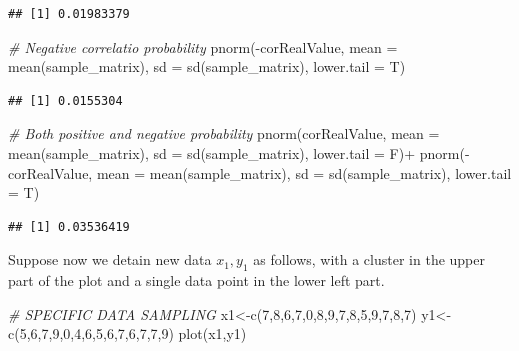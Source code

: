 \documentclass[
  notitlepage,
  onecolumn,
  openany]{book}
\newenvironment{Shaded}{\begin{snugshade}}{\end{snugshade}}
\newcommand{\AttributeTok}[1]{\textcolor[rgb]{0.77,0.63,0.00}{#1}}
\newcommand{\CommentTok}[1]{\textcolor[rgb]{0.56,0.35,0.01}{\textit{#1}}}
\newcommand{\DecValTok}[1]{\textcolor[rgb]{0.00,0.00,0.81}{#1}}
\newcommand{\FunctionTok}[1]{\textcolor[rgb]{0.00,0.00,0.00}{#1}}
\newcommand{\NormalTok}[1]{#1}
\newcommand{\OtherTok}[1]{\textcolor[rgb]{0.56,0.35,0.01}{#1}}
\newcommand{\SpecialCharTok}[1]{\textcolor[rgb]{0.00,0.00,0.00}{#1}}
\begin{document}
\begin{verbatim}
## [1] 0.01983379
\end{verbatim}

\begin{Shaded}
\begin{Highlighting}[]
\CommentTok{\# Negative correlatio probability}
\FunctionTok{pnorm}\NormalTok{(}\SpecialCharTok{{-}}\NormalTok{corRealValue, }\AttributeTok{mean =} \FunctionTok{mean}\NormalTok{(sample\_matrix), }
      \AttributeTok{sd =} \FunctionTok{sd}\NormalTok{(sample\_matrix), }\AttributeTok{lower.tail =}\NormalTok{ T)}
\end{Highlighting}
\end{Shaded}

\begin{verbatim}
## [1] 0.0155304
\end{verbatim}

\begin{Shaded}
\begin{Highlighting}[]
\CommentTok{\# Both positive and negative probability}
\FunctionTok{pnorm}\NormalTok{(corRealValue, }\AttributeTok{mean =} \FunctionTok{mean}\NormalTok{(sample\_matrix), }
      \AttributeTok{sd =} \FunctionTok{sd}\NormalTok{(sample\_matrix), }\AttributeTok{lower.tail =}\NormalTok{ F)}\SpecialCharTok{+}
  \FunctionTok{pnorm}\NormalTok{(}\SpecialCharTok{{-}}\NormalTok{corRealValue, }\AttributeTok{mean =} \FunctionTok{mean}\NormalTok{(sample\_matrix), }
        \AttributeTok{sd =} \FunctionTok{sd}\NormalTok{(sample\_matrix), }\AttributeTok{lower.tail =}\NormalTok{ T)}
\end{Highlighting}
\end{Shaded}

\begin{verbatim}
## [1] 0.03536419
\end{verbatim}

Suppose now we detain new data \(x_1, y_1\) as follows, with a cluster in the upper part of the plot and a single data point in the lower left part.

\begin{Shaded}
\begin{Highlighting}[]
\CommentTok{\# SPECIFIC DATA SAMPLING}
\NormalTok{x1}\OtherTok{\textless{}{-}}\FunctionTok{c}\NormalTok{(}\DecValTok{7}\NormalTok{,}\DecValTok{8}\NormalTok{,}\DecValTok{6}\NormalTok{,}\DecValTok{7}\NormalTok{,}\DecValTok{0}\NormalTok{,}\DecValTok{8}\NormalTok{,}\DecValTok{9}\NormalTok{,}\DecValTok{7}\NormalTok{,}\DecValTok{8}\NormalTok{,}\DecValTok{5}\NormalTok{,}\DecValTok{9}\NormalTok{,}\DecValTok{7}\NormalTok{,}\DecValTok{8}\NormalTok{,}\DecValTok{7}\NormalTok{)}
\NormalTok{y1}\OtherTok{\textless{}{-}}\FunctionTok{c}\NormalTok{(}\DecValTok{5}\NormalTok{,}\DecValTok{6}\NormalTok{,}\DecValTok{7}\NormalTok{,}\DecValTok{9}\NormalTok{,}\DecValTok{0}\NormalTok{,}\DecValTok{4}\NormalTok{,}\DecValTok{6}\NormalTok{,}\DecValTok{5}\NormalTok{,}\DecValTok{6}\NormalTok{,}\DecValTok{7}\NormalTok{,}\DecValTok{6}\NormalTok{,}\DecValTok{7}\NormalTok{,}\DecValTok{7}\NormalTok{,}\DecValTok{9}\NormalTok{)}
\FunctionTok{plot}\NormalTok{(x1,y1)}
\end{Highlighting}
\end{Shaded}
\end{document}
